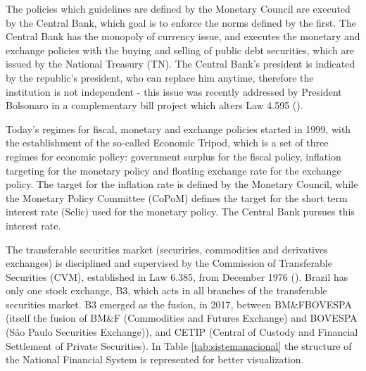 \documentclass[cic,tc, english]{iiufrgs}
\begin{document}
    The policies which guidelines are defined by the Monetary Council are executed by the Central Bank, which goal is to enforce the norms defined by the first. The Central Bank has the monopoly of currency issue, and executes the monetary and exchange policies with the buying and selling of public debt securities, which are issued by the National Treasury (TN). The Central Bank's president is indicated by the republic's president, who can replace him anytime, therefore the institution is not independent - this issue was recently addressed by President Bolsonaro in a complementary bill project which alters Law 4.595 (\citet{lei4595}).

    Today's regimes for fiscal, monetary and exchange policies started in 1999, with the establishment of the so-called Economic Tripod, which is a set of three regimes for economic policy: government surplus for the fiscal policy, inflation targeting for the monetary policy and floating exchange rate for the exchange policy. The target for the inflation rate is defined by the Monetary Council, while the Monetary Policy Committee (CoPoM) defines the target for the short term interest rate (Selic) used for the monetary policy. The Central Bank pursues this interest rate.

    The transferable securities market (securiries, commodities and derivatives exchanges) is disciplined and supervised by the Commission of Transferable Securities (CVM), established in Law 6.385, from December 1976 (\citet{lei6385}). Brazil has only one stock exchange, B3, which acts in all branches of the transferable securities market. B3 emerged as the fusion, in 2017, between BM\&FBOVESPA (itself the fusion of BM\&F (Commodities and Futures Exchange) and BOVESPA (São Paulo Securities Exchange)), and CETIP (Central of Custody and Financial Settlement of Private Securities).  In Table \ref{tab:sistemanacional} the structure of the National Financial System is represented for better visualization.
\end{document}
